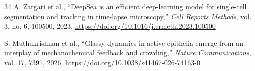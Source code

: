 \documentclass[11pt,a4paper]{article}
\begin{document}
\begin{thebibliography}{34}
 A. Zargari et al., “DeepSea is an efficient deep-learning model for single-cell segmentation and tracking in time-lapse microscopy,” \textit{Cell Reports Methods}, vol. 3, no. 6, 100500, 2023. \url{https://doi.org/10.1016/j.crmeth.2023.100500}

 S. Muthukrishnan et al., “Glassy dynamics in active epithelia emerge from an interplay of mechanochemical feedback and crowding,” \textit{Nature Communications}, vol. 17, 7391, 2026. \url{https://doi.org/10.1038/s41467-026-74163-0}
\end{thebibliography}
\endgroup
\end{document}
